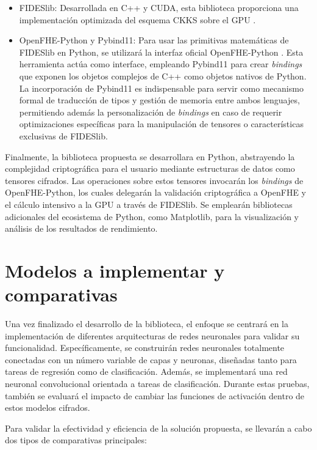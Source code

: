 \begin{itemize}
    \item FIDESlib: Desarrollada en C++ y CUDA, esta biblioteca proporciona una implementación optimizada del esquema CKKS sobre el GPU \cite{FIDESlib}. 
    
    \item OpenFHE-Python y Pybind11: Para usar las primitivas matemáticas de FIDESlib en Python, se utilizará la interfaz oficial OpenFHE-Python \cite{OpenFHEPython}. Esta herramienta actúa como interface, empleando Pybind11 para crear \textit{bindings} que exponen los objetos complejos de C++ como objetos nativos de Python. La incorporación de Pybind11 es indispensable para servir como mecanismo formal de traducción de tipos y gestión de memoria entre ambos lenguajes, permitiendo además la personalización de \textit{bindings} en caso de requerir optimizaciones específicas para la manipulación de tensores o características exclusivas de FIDESlib.
\end{itemize}

Finalmente, la biblioteca propuesta se desarrollara en Python, abstrayendo la complejidad criptográfica para el usuario mediante estructuras de datos como tensores cifrados. Las operaciones sobre estos tensores invocarán los \textit{bindings} de OpenFHE-Python, los cuales delegarán la validación criptográfica a OpenFHE y el cálculo intensivo a la GPU a través de FIDESlib. Se emplearán bibliotecas adicionales del ecosistema de Python, como Matplotlib, para la visualización y análisis de los resultados de rendimiento.

\section{Modelos a implementar y comparativas}

Una vez finalizado el desarrollo de la biblioteca, el enfoque se centrará en la implementación de diferentes arquitecturas de redes neuronales para validar su funcionalidad. Específicamente, se construirán redes neuronales totalmente conectadas con un número variable de capas y neuronas, diseñadas tanto para tareas de regresión como de clasificación. Además, se implementará una red neuronal convolucional orientada a tareas de clasificación. Durante estas pruebas, también se evaluará el impacto de cambiar las funciones de activación dentro de estos modelos cifrados.

Para validar la efectividad y eficiencia de la solución propuesta, se llevarán a cabo dos tipos de comparativas principales:

